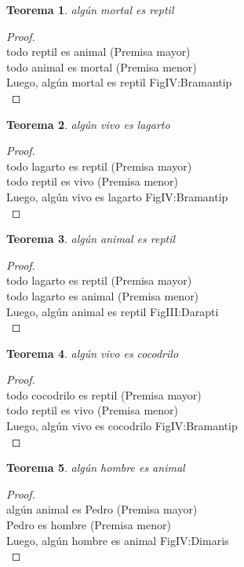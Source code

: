 ﻿\documentclass[12pt]{book}
\newtheorem{theorem}{Teorema}[chapter]
\newtheorem{proof}{Demostración}
\begin{document}
\begin{theorem}
algún mortal es reptil
\label{th: 67}
\end{theorem}\begin{proof}\\todo reptil es animal	 (Premisa mayor) \\todo animal es mortal	 (Premisa menor) \\Luego, algún mortal es reptil	FigIV:Bramantip \\ \end{proof}
\begin{theorem}
algún vivo es lagarto
\label{th: 68}
\end{theorem}\begin{proof}\\todo lagarto es reptil	 (Premisa mayor) \\todo reptil es vivo	 (Premisa menor) \\Luego, algún vivo es lagarto	FigIV:Bramantip \\ \end{proof}
\begin{theorem}
algún animal es reptil
\label{th: 69}
\end{theorem}\begin{proof}\\todo lagarto es reptil	 (Premisa mayor) \\todo lagarto es animal	 (Premisa menor) \\Luego, algún animal es reptil	FigIII:Darapti \\ \end{proof}
\begin{theorem}
algún vivo es cocodrilo
\label{th: 70}
\end{theorem}\begin{proof}\\todo cocodrilo es reptil	 (Premisa mayor) \\todo reptil es vivo	 (Premisa menor) \\Luego, algún vivo es cocodrilo	FigIV:Bramantip \\ \end{proof}
\begin{theorem}
algún hombre es animal
\label{th: 71}
\end{theorem}\begin{proof}\\algún animal es Pedro	 (Premisa mayor) \\Pedro es hombre	 (Premisa menor) \\Luego, algún hombre es animal	FigIV:Dimaris \\ \end{proof}
\end{document}
